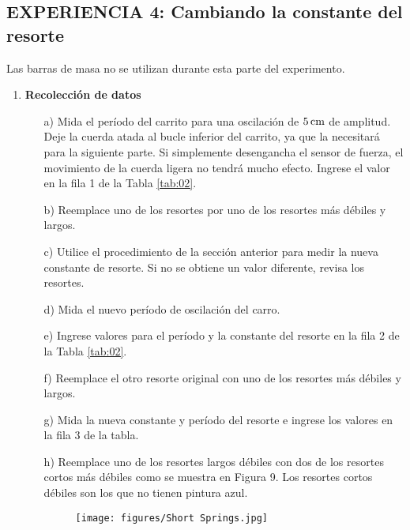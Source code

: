 \documentclass[9pt,a4paper,twocolumn,twoside]{tau-class/tau}
\begin{document}
\subsection{EXPERIENCIA 4: Cambiando  la  constante  del  resorte}
\begin{note}
     Las  barras  de  masa  no  se  utilizan  durante  esta  parte  del  experimento.
\end{note}
\begin{enumerate}
    \item \textbf{Recolección de datos}
        \begin{itemize}
            \item [a)]   Mida  el  período  del  carrito  para  una  oscilación  de  $5\,\rm  cm$  de  amplitud.  Deje  la  cuerda  atada  al  bucle  inferior  del  carrito,  ya  que  la  necesitará  para  la  siguiente  parte.  Si  simplemente  desengancha  el  sensor  de  fuerza,  el  movimiento  de  la  cuerda  ligera  no  tendrá  mucho  efecto.  Ingrese  el  valor  en  la  fila  1  de  la  Tabla \textcolor{blue}{\ref{tab:02}}.
            \item [b)] Reemplace  uno  de  los  resortes  por  uno  de  los  resortes  más  débiles  y  largos.
            \item [c)]   Utilice  el  procedimiento  de  la  sección  anterior  para  medir  la  nueva  constante  de  resorte.  Si  no se obtiene  un  valor  diferente,  revisa  los  resortes.
            \item [d)]   Mida  el  nuevo  período  de  oscilación  del  carro. 
            \item [e)]  Ingrese  valores  para  el  período  y  la  constante  del  resorte  en  la  fila  2  de  la  Tabla  \textcolor{blue}{\ref{tab:02}}.
            \item [f)] Reemplace  el  otro  resorte  original  con  uno  de  los  resortes  más  débiles  y  largos.
            \item [g)]    Mida  la  nueva  constante  y  período  del  resorte  e  ingrese  los  valores  en  la  fila  3  de  la  tabla.
            \item[h)]  Reemplace  uno  de  los  resortes  largos  débiles  con  dos  de  los  resortes  cortos  más  débiles  como  se  muestra  en  Figura  9.  Los  resortes  cortos  débiles  son  los  que  no  tienen  pintura  azul.
            \begin{figure}[htbp]
                \centering
                \hfill
                \texttt{[image: figures/Short Springs.jpg]}

\end{figure}
\end{itemize}
\end{enumerate}
\end{document}
